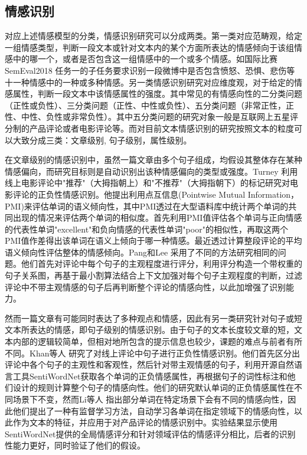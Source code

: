 \subsection{情感识别}

对应上述情感模型的分类，情感识别研究可以分成两类。第一类对应范畴观，给定一组情感类型，判断一段文本或针对文本内的某个方面所表达的情感倾向于该组情感中的哪一个，或者是否包含这一组情感中的一个或多个情感。如国际比赛SemEval2018 \cite{mohammad2018semeval}任务一的子任务要求识别一段微博中是否包含愤怒、恐惧、悲伤等十一种情感中的一种或多种情感。另一类情感识别研究对应维度观，对于给定的情感属性，判断一段文本中该情感属性的强度。其中常见的有情感向性的二分类问题（正性或负性）、三分类问题（正性、中性或负性）、五分类问题（非常正性，正性、中性、负性或非常负性）。其中五分类问题的研究对象一般是互联网上五星评分制的产品评论或者电影评论等。而对目前文本情感识别的研究按照文本的粒度可以大致分成三类：文章级别, 句子级别，属性级别。

在文章级别的情感识别中，虽然一篇文章由多个句子组成，均假设其整体存在某种情感偏向，而研究目标则是自动识别出该种情感偏向的类型或强度。Turney \cite{turney2002thumbs} 利用线上电影评论中"推荐"（大拇指朝上）和"不推荐"（大拇指朝下）的标记研究对电影评论的正负性情感识别。他提出利用点互信息(Pointwise Mutual Information，PMI)来评估单词的语义倾向性，其中PMI透过在大型语料库中统计两个单词的共同出现的情况来评估两个单词的相似度。首先利用PMI值评估各个单词与正向情感的代表性单词"excellent"和负向情感的代表性单词"poor"的相似性，再取这两个PMI值作差得出该单词在语义上倾向于哪一种情感。最近透过计算整段评论的平均语义倾向性评估整体的情感倾向。Pang和Lee \cite{pang2004sentimental} 采用了不同的方法研究相同的问题。他们首先对评论中每个句子的主观程度进行评分，利用评分构造一个带权重的句子关系图，再基于最小割算法结合上下文加强对每个句子主观程度的判断，过滤评论中不带主观情感的句子后再判断整个评论的情感向性，以此加增强了识别能力。

然而一篇文章有可能同时表达了多种观点和情感，因此有另一类研究针对句子或短文本所表达的情感，即句子级别的情感识别。由于句子的文本长度较文章的短，文本内部的逻辑较简单，但相对地所包含的提示信息也较少，课题的难点与前者有所不同。Khan等人 \cite{khan2011sentiment} 研究了对线上评论中句子进行正负性情感识别。他们首先区分出评论中各个句子的主观性和客观性，然后针对带主观情感的句子，利用开源自然语言工具SentiWordNet获取各个单词的正负情感属性，再根据句子的词性标注和他们设计的规则计算整个句子的情感向性。他们的研究默认单词的正负情感属性在不同场景下不变，然而Li等人\cite{li2013constructing} 指出部分单词在特定场景下会有不同的情感向性，因此他们提出了一种有监督学习方法，自动学习各单词在指定领域下的情感向性，以此作为文本的特征，并应用于对产品评论的情感识别中。实验结果显示使用SentiWordNet提供的全局情感评分和针对领域评估的情感评分相比，后者的识别性能力更好，同时验证了他们的假设。

